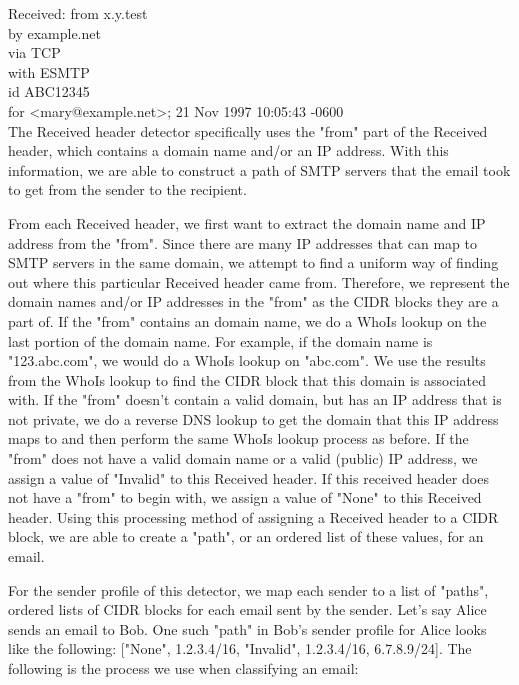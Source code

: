 \documentclass[letterpaper]{article}
\newcommand\tab[1][1cm]{\hspace*{#1}}
\begin{document}
Received: from x.y.test\\
\tab by example.net\\
\tab via TCP\\
\tab with ESMTP\\
\tab id ABC12345\\
\tab for <mary@example.net>;  21 Nov 1997 10:05:43 -0600\\

The Received header detector specifically uses the "from" part of the Received header, which contains a domain name and/or an IP address. With this information, we are able to construct a path of SMTP servers that the email took to get from the sender to the recipient. 

From each Received header, we first want to extract the domain name and IP address from the "from". Since there are many IP addresses that can map to SMTP servers in the same domain, we attempt to find a uniform way of finding out where this particular Received header came from. Therefore, we represent the domain names and/or IP addresses in the "from" as the CIDR blocks they are a part of. If the "from" contains an domain name, we do a WhoIs lookup on the last portion of the domain name. For example, if the domain name is "123.abc.com", we would do a WhoIs lookup on "abc.com". We use the results from the WhoIs lookup to find the CIDR block that this domain is associated with. If the "from" doesn't contain a valid domain, but has an IP address that is not private, we do a reverse DNS lookup to get the domain that this IP address maps to and then perform the same WhoIs lookup process as before. If the "from" does not have a valid domain name or a valid (public) IP address, we assign a value of "Invalid" to this Received header. If this received header does not have a "from" to begin with, we assign a value of "None" to this Received header. Using this processing method of assigning a Received header to a CIDR block, we are able to create a "path", or an ordered list of these values, for an email. 

For the sender profile of this detector, we map each sender to a list of "paths", ordered lists of CIDR blocks for each email sent by the sender. Let's say Alice sends an email to Bob. One such "path" in Bob's sender profile for Alice looks like the following: ["None", 1.2.3.4/16, "Invalid", 1.2.3.4/16, 6.7.8.9/24]. The following is the process we use when classifying an email:
\end{document}
